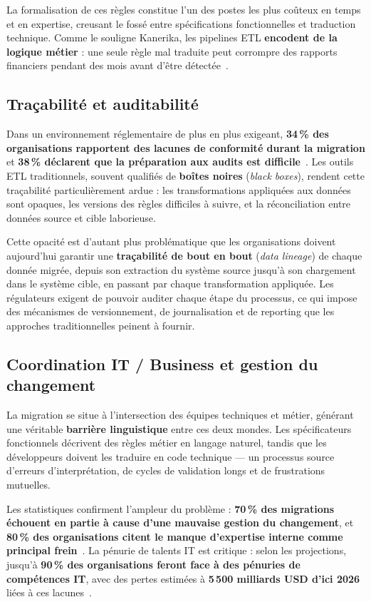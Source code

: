 La formalisation de ces règles constitue l'un des postes les plus coûteux en
temps et en expertise, creusant le fossé entre spécifications fonctionnelles
et traduction technique. Comme le souligne Kanerika, les pipelines ETL
\textbf{encodent de la logique métier} : une seule règle mal traduite peut
corrompre des rapports financiers pendant des mois avant d'être
détectée~\cite{kanerika_etl}.

\subsection{Traçabilité et auditabilité}

Dans un environnement réglementaire de plus en plus exigeant,
\textbf{34\,\% des organisations rapportent des lacunes de conformité
durant la migration} et \textbf{38\,\% déclarent que la préparation aux
audits est difficile}~\cite{gitnux_cloud, admp_overview}. Les outils ETL
traditionnels, souvent qualifiés de \textbf{boîtes noires} (\textit{black
boxes}), rendent cette traçabilité particulièrement ardue : les
transformations appliquées aux données sont opaques, les versions des règles
difficiles à suivre, et la réconciliation entre données source et cible
laborieuse.

Cette opacité est d'autant plus problématique que les organisations doivent
aujourd'hui garantir une \textbf{traçabilité de bout en bout}
(\textit{data lineage}) de chaque donnée migrée, depuis son extraction du
système source jusqu'à son chargement dans le système cible, en passant par
chaque transformation appliquée. Les régulateurs exigent de pouvoir auditer
chaque étape du processus, ce qui impose des mécanismes de versionnement,
de journalisation et de reporting que les approches traditionnelles peinent
à fournir.

\subsection{Coordination IT / Business et gestion du changement}

La migration se situe à l'intersection des équipes techniques et métier,
générant une véritable \textbf{barrière linguistique} entre ces deux
mondes. Les spécificateurs fonctionnels décrivent des règles métier en
langage naturel, tandis que les développeurs doivent les traduire en code
technique --- un processus source d'erreurs d'interprétation, de cycles de
validation longs et de frustrations mutuelles.

Les statistiques confirment l'ampleur du problème : \textbf{70\,\% des
migrations échouent en partie à cause d'une mauvaise gestion du changement},
et \textbf{80\,\% des organisations citent le manque d'expertise interne
comme principal frein}~\cite{worldmetrics2025, wifitalents2025}. La pénurie
de talents IT est critique : selon les projections, jusqu'à \textbf{90\,\%
des organisations feront face à des pénuries de compétences IT}, avec des
pertes estimées à \textbf{5\,500 milliards USD d'ici 2026} liées à ces
lacunes~\cite{integrate_io_stats}.

